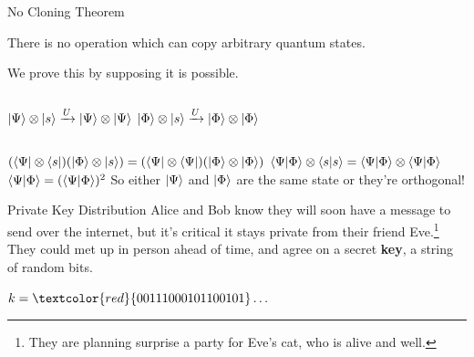 \documentclass{beamer}
\begin{document}
\begin{frame}{No Cloning Theorem}
\begin{theorem}
    There is no operation which can copy arbitrary quantum states.
\end{theorem}\vfill
We prove this by supposing it is possible.\vfill
\begin{columns}
\centering
\begin{math}
    \ket{\Psi} \otimes \ket{s} \xrightarrow{U} \ket{\Psi} \otimes \ket{\Psi}
\end{math}
\centering
\begin{math}
    \ket{\Phi} \otimes \ket{s} \xrightarrow{U} \ket{\Phi} \otimes \ket{\Phi}
\end{math}
\end{columns}
\pause
\vfill
\centering
\begin{math}
    (\bra{\Psi} \otimes \bra{s}) (\ket{\Phi} \otimes \ket{s}) = (\bra{\Psi} \otimes \bra{\Psi}) (\ket{\Phi} \otimes \ket{\Phi})
\end{math}\vfill
\pause
\begin{math}
    \braket{\Psi}{\Phi} \otimes \braket{s}{s} = \braket{\Psi}{\Phi} \otimes \braket{\Psi}{\Phi}
\end{math}\vfill
\pause
\begin{math}
    \braket{\Psi}{\Phi} = (\braket{\Psi}{\Phi})^2
\end{math}\vfill
So either $\ket{\Psi}$ and $\ket{\Phi}$ are the same state or they're orthogonal!
\end{frame}


\begin{frame}{Private Key Distribution}
    Alice and Bob know they will soon have a message to send over the internet, but it's critical it stays private from their friend Eve.\footnote{They are planning surprise a party for Eve's cat, who is alive and well.}\vfill
    \pause
    They could met up in person ahead of time, and agree on a secret \textbf{key}, a string of random bits.\vfill
    \begin{center}
        \begin{math}
            k = \textcolor{red}{00111000101100101}\dots
        \end{math}
    \end{center}\vfill
\end{frame}
\end{document}

